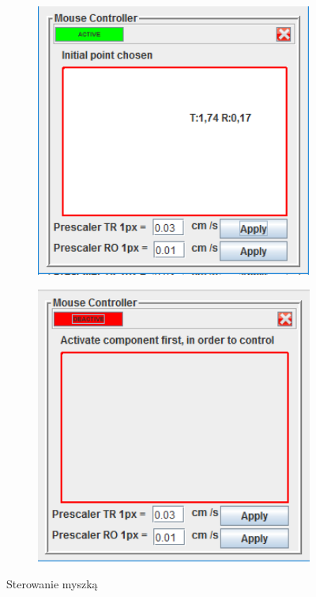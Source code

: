 \documentclass[eng,printmode]{mgr}
\begin{document}
   \begin{figure}[ht]
    \centering
    \begin{subfigure}{.45\textwidth}
     \centering
     \includegraphics[width=1\textwidth]{images/mause1}
     \label{fig:mause1}
    \end{subfigure}
    \begin{subfigure}{.45\textwidth}
     \centering
     \includegraphics[width=1\textwidth]{images/metro2}
     \label{fig:metro2}
    \end{subfigure}
    \caption{Sterowanie myszką}
    \label{fig:Blok_ster}
   \end{figure}
\end{document}
